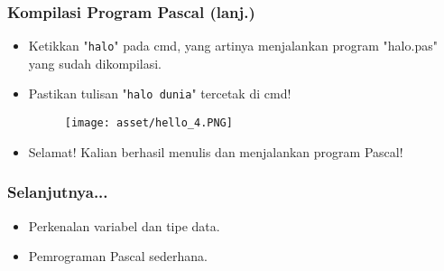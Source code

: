 \begin{frame}
\frametitle{Kompilasi Program Pascal (lanj.)}
\begin{itemize}
  \item Ketikkan "\texttt{halo}" pada cmd, yang artinya menjalankan program "halo.pas" yang sudah dikompilasi.
  \item Pastikan tulisan "\texttt{halo dunia}" tercetak di cmd!
  \begin{figure}
    \texttt{[image: asset/hello\_4.PNG]}
  \end{figure}
  \item Selamat! Kalian berhasil menulis dan menjalankan program Pascal!
\end{itemize}
\end{frame}

\begin{frame}
\frametitle{Selanjutnya...}
\begin{itemize}
  \item Perkenalan variabel dan tipe data.
  \item Pemrograman Pascal sederhana.
\end{itemize}
\end{frame}


